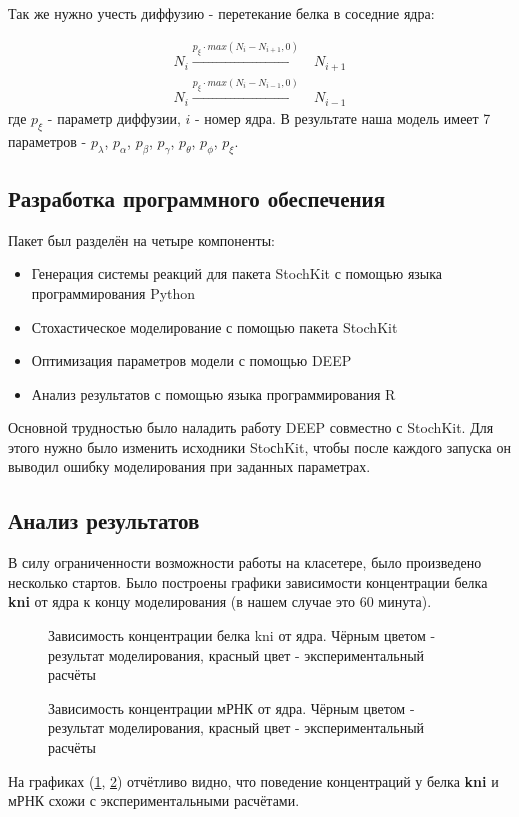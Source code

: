 Так же нужно учесть диффузию - перетекание белка в соседние ядра:

\begin{align*}
N_i   \xrightarrow{p_{\xi} \cdot max(N_i - N_{i+1}, 0)} & N_{i+1} \\
N_i   \xrightarrow{p_{\xi} \cdot max(N_i - N_{i-1}, 0)} & N_{i-1}
\end{align*}
где $p_{\xi}$ - параметр диффузии, $i$ - номер ядра.
В результате наша модель имеет 7 параметров - $p_{\lambda}$, $p_{\alpha}$, $p_{\beta}$, $p_{\gamma}$, $p_{\theta}$, $p_{\phi}$, $p_{\xi}$.


\subsection{Разработка программного обеспечения}
Пакет был разделён на четыре компоненты:
\begin{itemize}
  \item Генерация системы реакций для пакета StochKit с помощью языка программирования Python
  \item Стохастическое моделирование с помощью пакета StochKit
  \item Оптимизация параметров модели с помощью DEEP
  \item Анализ результатов с помощью языка программирования R
\end{itemize}

Основной трудностью было наладить работу DEEP совместно с StochKit. Для этого нужно было изменить исходники StoсhKit, чтобы после каждого запуска он выводил ошибку моделирования при заданных параметрах.

\subsection{Анализ результатов}
В силу ограниченности возможности работы на класетере, было произведено несколько стартов. Было построены графики зависимости
концентрации белка \textbf{kni} от ядра к концу моделирования (в нашем случае это 60 минута).
\begin{figure}[h]
  \caption{Зависимость концентрации белка kni от ядра. Чёрным цветом - результат моделирования, красный цвет - экспериментальный расчёты}
  \label{fig:kni}
\end{figure}

\begin{figure}[h]
  \caption{Зависимость концентрации мРНК от ядра. Чёрным цветом - результат моделирования, красный цвет - экспериментальный расчёты}
  \label{fig:rna}
\end{figure}

На графиках (\ref{fig:kni}, \ref{fig:rna}) отчётливо видно, что поведение концентраций у белка \textbf{kni} и мРНК схожи с экспериментальными расчётами.

